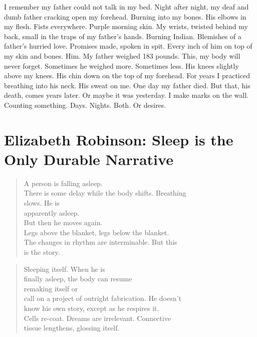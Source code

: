 \documentclass[
]{memoir}
\begin{document}
I remember my father could not talk in my bed. Night after night, my
deaf and dumb father cracking open my forehead. Burning into my bones.
His elbows in my flesh. Fists everywhere. Purple morning skin. My
wrists, twisted behind my back, small in the traps of my father's hands.
Burning Indian. Blemishes of a father's hurried love. Promises made,
spoken in spit. Every inch of him on top of my skin and bones. Him. My
father weighed 183 pounds. This, my body will never forget. Sometimes he
weighed more. Sometimes less. His knees slightly above my knees. His
chin down on the top of my forehead. For years I practiced breathing
into his neck. His sweat on me. One day my father died. But that, his
death, comes years later. Or maybe it was yesterday. I make marks on the
wall. Counting something. Days. Nights. Both. Or desires.

\hypertarget{elizabeth-robinson-sleep-is-the-only-durable-narrative}{%
\chapter{Elizabeth Robinson: Sleep is the Only Durable
Narrative}\label{elizabeth-robinson-sleep-is-the-only-durable-narrative}}

\begin{verse}
A person is falling asleep.\\
There is some delay while the body shifts. Breathing\\
slows. He is\\
apparently asleep.\\
But then he moves again.\\
Legs above the blanket, legs below the blanket.\\
The changes in rhythm are interminable. But this\\
is the story.\\
\end{verse}

\begin{verse}
Sleeping itself. When he is\\
finally asleep, the body can resume\\
remaking itself or\\
call on a project of outright fabrication. He doesn't\\
know his own story, except as he respires it.\\
Cells re-coat. Dreams are irrelevant. Connective\\
tissue lengthens, glossing itself.\\
\end{verse}
\end{document}
